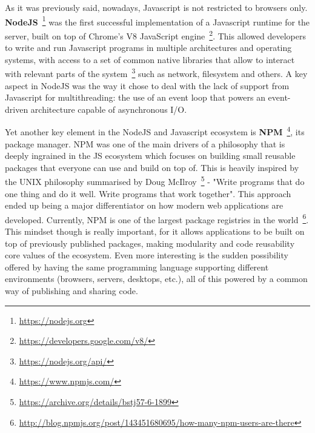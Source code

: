 As it was previously said, nowadays, Javascript is not restricted to
browsers only. \textbf{NodeJS}~\footnote{\url{https://nodejs.org}} was the first
successful implementation of a Javascript runtime for the server, built
on top of Chrome's V8 JavaScript engine~\footnote{\url{https://developers.google.com/v8/}}. This
allowed developers to write and run Javascript programs in multiple
architectures and operating systems, with access to a set of common
native libraries that allow to interact with relevant parts of the
system~\footnote{\url{https://nodejs.org/api/}} such as network, filesystem and
others. A key aspect in NodeJS was the way it chose to deal with the
lack of support from Javascript for multithreading: the use of an event
loop that powers an event-driven architecture capable of asynchronous
I/O.

Yet another key element in the NodeJS and Javascript ecosystem is
\textbf{NPM}~\footnote{\url{https://www.npmjs.com/}}, its package manager. NPM was one
of the main drivers of a philosophy that is deeply ingrained in the JS
ecosystem which focuses on building small reusable packages that
everyone can use and build on top of. This is heavily inspired by the
UNIX philosophy summarised by Doug McIlroy~\footnote{\url{https://archive.org/details/bstj57-6-1899}} - "Write
programs that do one thing and do it well. Write programs that work
together". This approach ended up being a major differentiator on how
modern web applications are developed. Currently, NPM is one of the
largest package registries in the world~\footnote{\url{http://blog.npmjs.org/post/143451680695/how-many-npm-users-are-there}}.
This mindset though is really important, for it allows applications to
be built on top of previously published packages, making modularity and
code reusability core values of the ecosystem. Even more interesting is
the sudden possibility offered by having the same programming language
supporting different environments (browsers, servers, desktops, etc.),
all of this powered by a common way of publishing and sharing code.

